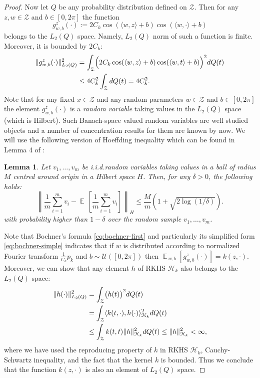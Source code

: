 \documentclass{article}
\newtheorem{lemma}{Lemma}
\DeclareMathOperator*{\E}{\mathbb{E}\,}
\renewcommand{\H}{\mathcal{H}}
\newcommand{\Z}{\mathcal{Z}}
\begin{document}
\begin{proof}
Now let $Q$ be any probability distribution defined on $\Z$. 
Then for any $z,w\in\Z$ and $b\in[0,2\pi]$ the function 
\[
g_{w,b}^z(\cdot) := 2 C_k \cos(\langle w, z\rangle+b)\cos(\langle w, \cdot\rangle+b)
\]
belongs to the $L_2(Q)$ space. 
Namely, $L_2(Q)$ norm of such a function is finite.
Moreover, it is bounded by $2C_k$:
\begin{align}
\notag
\|g_{w,b}^z(\cdot)\|^2_{L_2(Q)}&=\int_{\Z}\Bigl(2C_k\cos(\langle w, z\rangle+b)\cos(\langle w, t\rangle+b)\Bigr)^2 dQ(t)\\
\label{eq:fbounded}
&\leq
4C_k^2\int_{\Z}dQ(t) = 4C_k^2.
\end{align}
Note that for any fixed $x\in\Z$ and any random parameters $w\in\Z$ and
$b\in[0,2\pi]$ the element $g_{w,b}^z(\cdot)$ is a \emph{random variable}
taking values in the $L_2(Q)$ space (which is Hilbert).  Such Banach-space
valued random variables are well studied objects \cite{LT91} and a number of
concentration results for them are known by now.  We will use the following
version of Hoeffding inequality which can be found in Lemma 4 of
\cite{Rahimi09}:
\begin{lemma}
\label{lemma:rahimi_hoeffding}
Let $v_1,\dots,v_m$ be i.i.d.\:random variables taking values in a ball of
radius $M$ centred around origin in a Hilbert space $H$. 
Then, for any $\delta > 0$, the following holds: 
\[
\left\|\frac{1}{m}\sum_{i=1}^m v_i - \E\left[\frac{1}{m}\sum_{i=1}^m v_i \right]\right\|_{H} \leq \frac{M}{m}\left(1+\sqrt{2\log(1/\delta)}\right).
\]
with probability higher than $1-\delta$ over the random sample $v_1,\dots,v_m$.
\end{lemma}
Note that Bochner's formula \eqref{eq:bochner-first} and particularly its
simplified form \eqref{eq:bochner-simple} indicates that if $w$ is distributed
according to normalized Fourier transform $\frac{1}{C_k}p_k$ and
$b\sim\mathcal{U}([0,2\pi])$ then $\E_{w,b}[g_{w,b}^z(\cdot)] = k(z,\cdot)$.
Moreover, we can show that any element $h$ of RKHS $\H_k$ also belongs to the
$L_2(Q)$ space:
\begin{align}
\notag
\|h(\cdot)\|^2_{L_2(Q)}
&=\int_{\Z}\bigl(h(t)\bigr)^2 dQ(t)\\
\notag
&=\int_{\Z}\langle k(t,\cdot),h(\cdot)\rangle_{\H_k}^2 dQ(t)\\
\label{eq:hk-in-l2}
&\leq\int_{\Z}k(t,t)\|h\|_{\H_k}^2 dQ(t) \leq \|h\|_{\H_k}^2<\infty,
\end{align}
where we have used the reproducing property of $k$ in RKHS $\H_k$,
Cauchy-Schwartz inequality, and the fact that the kernel $k$ is bounded.  Thus
we conclude that the function $k(z,\cdot)$ is also an element of $L_2(Q)$
space.


\end{proof}
\end{document}
